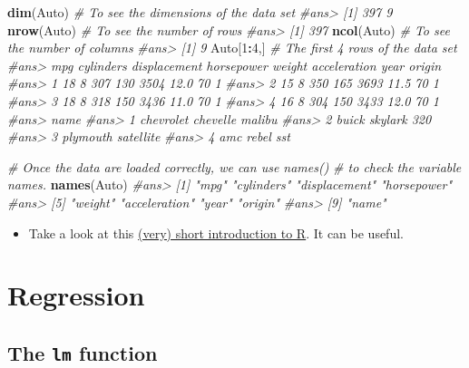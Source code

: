 \documentclass[]{book}
\newenvironment{Shaded}{\begin{snugshade}}{\end{snugshade}}
\newcommand{\KeywordTok}[1]{\textcolor[rgb]{0.13,0.29,0.53}{\textbf{#1}}}
\newcommand{\DecValTok}[1]{\textcolor[rgb]{0.00,0.00,0.81}{#1}}
\newcommand{\CommentTok}[1]{\textcolor[rgb]{0.56,0.35,0.01}{\textit{#1}}}
\newcommand{\OperatorTok}[1]{\textcolor[rgb]{0.81,0.36,0.00}{\textbf{#1}}}
\newcommand{\NormalTok}[1]{#1}
\newenvironment{rmdblock}[1]
  {\begin{shaded*}
  \begin{itemize}
  \renewcommand{\labelitemi}{
    \raisebox{-.7\height}[0pt][0pt]{
      {\setkeys{Gin}{width=2em,keepaspectratio}\texttt{[image: img/icons/\#1]}}
    }
  }
  \item
  }
  {
  \end{itemize}
  \end{shaded*}
  }
\newenvironment{rmdinsight}
  {\begin{rmdblock}{insight}}
  {\end{rmdblock}}
\begin{document}
\begin{Shaded}
\begin{Highlighting}[]
\KeywordTok{dim}\NormalTok{(Auto) }\CommentTok{# To see the dimensions of the data set}
\CommentTok{#ans> [1] 397   9}
\KeywordTok{nrow}\NormalTok{(Auto) }\CommentTok{# To see the number of rows}
\CommentTok{#ans> [1] 397}
\KeywordTok{ncol}\NormalTok{(Auto) }\CommentTok{# To see the number of columns}
\CommentTok{#ans> [1] 9}
\NormalTok{Auto[}\DecValTok{1}\OperatorTok{:}\DecValTok{4}\NormalTok{,] }\CommentTok{# The first 4 rows of the data set}
\CommentTok{#ans>   mpg cylinders displacement horsepower weight acceleration year origin}
\CommentTok{#ans> 1  18         8          307        130   3504         12.0   70      1}
\CommentTok{#ans> 2  15         8          350        165   3693         11.5   70      1}
\CommentTok{#ans> 3  18         8          318        150   3436         11.0   70      1}
\CommentTok{#ans> 4  16         8          304        150   3433         12.0   70      1}
\CommentTok{#ans>                        name}
\CommentTok{#ans> 1 chevrolet chevelle malibu}
\CommentTok{#ans> 2         buick skylark 320}
\CommentTok{#ans> 3        plymouth satellite}
\CommentTok{#ans> 4             amc rebel sst}
\end{Highlighting}
\end{Shaded}

\begin{Shaded}
\begin{Highlighting}[]
\CommentTok{# Once the data are loaded correctly, we can use names()}
\CommentTok{# to check the variable names.}
\KeywordTok{names}\NormalTok{(Auto)}
\CommentTok{#ans> [1] "mpg"          "cylinders"    "displacement" "horsepower"  }
\CommentTok{#ans> [5] "weight"       "acceleration" "year"         "origin"      }
\CommentTok{#ans> [9] "name"}
\end{Highlighting}
\end{Shaded}

\begin{rmdinsight}
Take a look at this
\href{https://cran.r-project.org/doc/contrib/Torfs+Brauer-Short-R-Intro.pdf}{(very)
short introduction to R}. It can be useful.
\end{rmdinsight}

\section{Regression}\label{regression}

\subsection{\texorpdfstring{The \texttt{lm}
function}{The lm function}}\label{the-lm-function}
\end{document}
